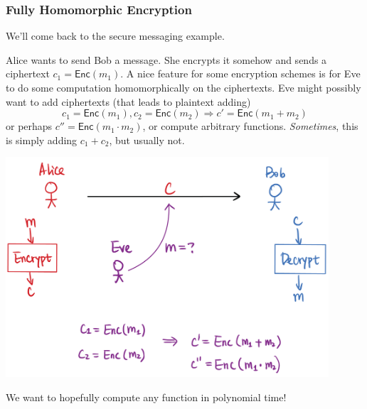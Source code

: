 \subsubsection{Fully Homomorphic Encryption}
We'll come back to the secure messaging example.

Alice wants to send Bob a message. She encrypts it somehow and sends a ciphertext $c_1 = \mathsf{Enc}(m_1)$. A nice feature for some encryption schemes is for Eve to do some computation homomorphically on the ciphertexts. Eve might possibly want to add ciphertexts (that leads to plaintext adding)
\[c_1 = \mathsf{Enc}(m_1), c_2 = \mathsf{Enc}(m_2)\Rightarrow c' = \mathsf{Enc}(m_1 + m_2)\]
or perhaps $c'' = \mathsf{Enc}(m_1\cdot m_2)$, or compute arbitrary functions. \emph{Sometimes}, this is simply adding $c_1 + c_2$, but usually not.

\begin{center}
    \includegraphics[width=0.9\textwidth]{images/2023-01-26/homomorphic_encryption.png}
\end{center}

We want to hopefully compute any function in polynomial time!

